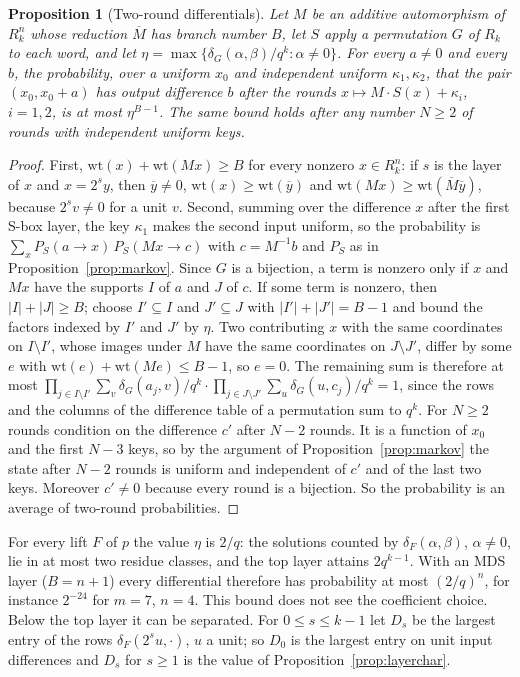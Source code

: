 \documentclass[11pt]{article}
\newtheorem{proposition}[theorem]{Proposition}
\theoremstyle{definition}
\theoremstyle{remark}
\newcommand{\ol}[1]{\overline{#1}}
\begin{document}
\begin{proposition}[Two-round differentials]\label{prop:hull}
Let $M$ be an additive automorphism of $R_k^n$ whose reduction $\ol M$ has branch number $B$, let $S$ apply a
permutation $G$ of $R_k$ to each word, and let $\eta=\max\{\delta_G(\alpha,\beta)/q^k:\alpha\ne0\}$. For every $a\ne0$
and every $b$, the probability, over a uniform $x_0$ and independent uniform $\kappa_1,\kappa_2$, that the pair
$(x_0,x_0+a)$ has output difference $b$ after the rounds $x\mapsto M\cdot S(x)+\kappa_i$, $i=1,2$, is at most
$\eta^{B-1}$. The same bound holds after any number $N\ge2$ of rounds with independent uniform keys.
\end{proposition}
\begin{proof}
First, $\mathrm{wt}(x)+\mathrm{wt}(Mx)\ge B$ for every nonzero $x\in R_k^n$: if $s$ is the layer of $x$ and $x=2^sy$,
then $\ol y\ne0$, $\mathrm{wt}(x)\ge\mathrm{wt}(\ol y)$ and $\mathrm{wt}(Mx)\ge\mathrm{wt}(\ol M\ol y)$, because
$2^sv\ne0$ for a unit $v$. Second, summing over the difference $x$ after the first S-box layer, the key $\kappa_1$
makes the second input uniform, so the probability is $\sum_xP_S(a\to x)\,P_S(Mx\to c)$ with $c=M^{-1}b$ and $P_S$
as in Proposition~\ref{prop:markov}. Since $G$ is a bijection, a term is nonzero only if $x$ and $Mx$ have the
supports $I$ of $a$ and $J$ of $c$. If some term is nonzero, then $|I|+|J|\ge B$; choose $I'\subseteq I$ and
$J'\subseteq J$ with $|I'|+|J'|=B-1$ and bound the factors indexed by $I'$ and $J'$ by $\eta$. Two contributing $x$
with the same coordinates on $I\setminus I'$, whose images under $M$ have the same coordinates on $J\setminus J'$,
differ by some $e$ with $\mathrm{wt}(e)+\mathrm{wt}(Me)\le B-1$, so $e=0$. The remaining sum is therefore at most
$\prod_{j\in I\setminus I'}\sum_v\delta_G(a_j,v)/q^k\cdot\prod_{j\in J\setminus J'}\sum_u\delta_G(u,c_j)/q^k=1$, since
the rows and the columns of the difference table of a permutation sum to $q^k$. For $N\ge2$ rounds condition on the
difference $c'$ after $N-2$ rounds. It is a function of $x_0$ and the first $N-3$ keys, so by the argument of
Proposition~\ref{prop:markov} the state after $N-2$ rounds is uniform and independent of $c'$ and of the last two keys.
Moreover $c'\ne0$ because every round is a bijection. So the probability is an average of two-round probabilities.
\end{proof}

For every lift $F$ of $p$ the value $\eta$ is $2/q$: the solutions counted by $\delta_F(\alpha,\beta)$, $\alpha\ne0$, lie in
at most two residue classes, and the top layer attains $2q^{k-1}$. With an MDS layer ($B=n+1$) every differential
therefore has probability at most $(2/q)^n$, for instance $2^{-24}$ for $m=7$, $n=4$. This bound does not see the
coefficient choice. Below the top layer it can be separated. For $0\le s\le k-1$ let $D_s$ be the largest entry of the
rows $\delta_F(2^su,\cdot)$, $u$ a unit; so $D_0$ is the largest entry on unit input differences and $D_s$ for $s\ge1$
is the value of Proposition~\ref{prop:layerchar}.
\end{document}
